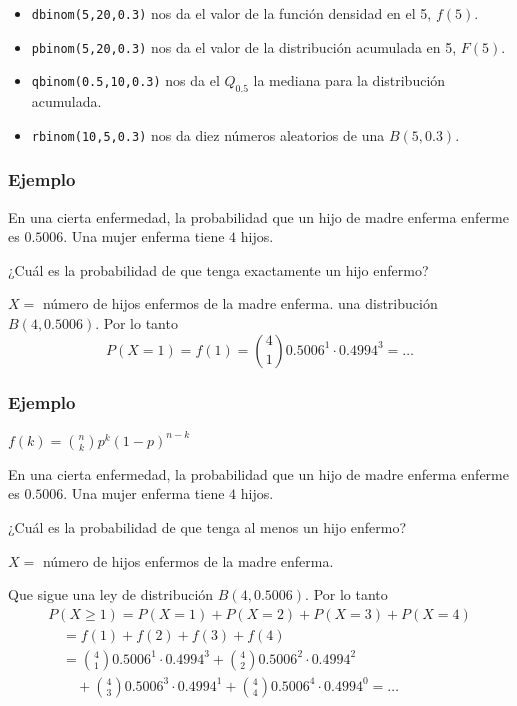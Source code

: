 \begin{frame}

\begin{itemize}
\item \texttt{dbinom(5,20,0.3)} nos da el valor de la función densidad en el 5, $f(5)$.
\item \texttt{pbinom(5,20,0.3)} nos da el valor de la distribución acumulada en  5,  $F(5)$.
\item \texttt{qbinom(0.5,10,0.3)} nos da el $Q_{0.5}$  la mediana para la distribución acumulada.
\item \texttt{rbinom(10,5,0.3)} nos da diez números aleatorios de una $B(5,0.3)$. 
\end{itemize}

\end{frame}


\begin{frame}
\frametitle{Ejemplo}
En una cierta enfermedad, la probabilidad que un hijo de madre enferma enferme es  $0.5006$. Una mujer enferma tiene $4$ hijos.
\medskip

¿Cuál es la probabilidad de que tenga exactamente un hijo enfermo?
\medskip

$X=$ número de hijos enfermos de la  madre enferma.
\medskip
una distribución  $B(4,0.5006)$. Por  lo tanto
$$
P(X=1)=f(1)=\binom{4}{1}0.5006^1\cdot 0.4994^3=\ldots
$$

\end{frame}


\begin{frame}
\frametitle{Ejemplo}
$f(k)=\binom{n}{k}p^k(1-p)^{n-k}$
\medskip

 En una cierta enfermedad, la probabilidad que un hijo de madre enferma enferme es  $0.5006$. Una mujer enferma tiene $4$ hijos.
\medskip

¿Cuál es la probabilidad de que tenga al menos un hijo enfermo?
\medskip\pause

$X=$ número de hijos enfermos de la  madre enferma.
\medskip


Que sigue una ley de distribución $B(4,0.5006)$. Por lo tanto
{\small $$
\begin{array}{l}
P(X\geq 1)= P(X=1)+P(X=2)+P(X=3)+P(X=4)\\
\quad =f(1)+f(2)+f(3)+f(4)\\
\quad =\binom{4}{1}0.5006^1\cdot 0.4994^3+\binom{4}{2}0.5006^2\cdot 0.4994^2\\ \qquad +\binom{4}{3}0.5006^3\cdot 0.4994^1+\binom{4}{4}0.5006^4\cdot 0.4994^0=\ldots
\end{array}
$$}
\end{frame}


